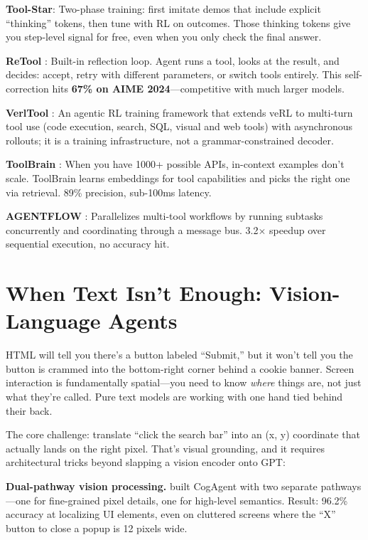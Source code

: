 \documentclass[12pt,a4paper]{report}
\theoremstyle{definition}
\begin{document}
\textbf{Tool-Star}: Two-phase training: first imitate demos that include explicit ``thinking'' tokens, then tune with RL on outcomes. Those thinking tokens give you step-level signal for free, even when you only check the final answer.

\textbf{ReTool} \cite{feng2025retool}: Built-in reflection loop. Agent runs a tool, looks at the result, and decides: accept, retry with different parameters, or switch tools entirely. This self-correction hits \textbf{67\% on AIME 2024}---competitive with much larger models.

\textbf{VerlTool} \cite{jiang2025verltool}: An agentic RL training framework that extends veRL to multi-turn tool use (code execution, search, SQL, visual and web tools) with asynchronous rollouts; it is a training infrastructure, not a grammar-constrained decoder.

\textbf{ToolBrain} \cite{le2025toolbrain}: When you have 1000+ possible APIs, in-context examples don't scale. ToolBrain learns embeddings for tool capabilities and picks the right one via retrieval. 89\% precision, sub-100ms latency.

\textbf{AGENTFLOW} \cite{chen2025agentflow}: Parallelizes multi-tool workflows by running subtasks concurrently and coordinating through a message bus. 3.2$\times$ speedup over sequential execution, no accuracy hit.

\section{When Text Isn't Enough: Vision-Language Agents}
\label{sec:vision_agents}

HTML will tell you there's a button labeled ``Submit,'' but it won't tell you the button is crammed into the bottom-right corner behind a cookie banner. Screen interaction is fundamentally spatial---you need to know \textit{where} things are, not just what they're called. Pure text models are working with one hand tied behind their back.

The core challenge: translate ``click the search bar'' into an (x, y) coordinate that actually lands on the right pixel. That's visual grounding, and it requires architectural tricks beyond slapping a vision encoder onto GPT:

\textbf{Dual-pathway vision processing.} \citet{hong2023cogagent} built CogAgent with two separate pathways---one for fine-grained pixel details, one for high-level semantics. Result: 96.2\% accuracy at localizing UI elements, even on cluttered screens where the ``X'' button to close a popup is 12 pixels wide.
\end{document}
